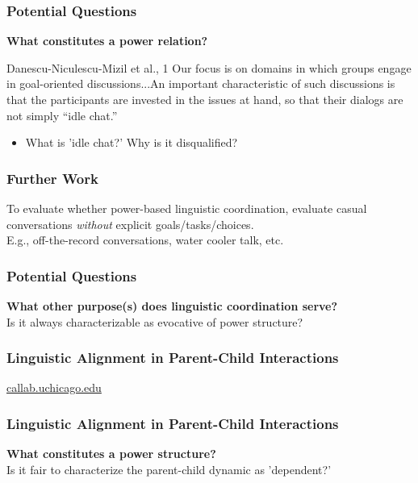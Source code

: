 \documentclass{beamer}
\begin{document}
\begin{frame}
\frametitle{Potential Questions}
\textbf{What constitutes a power relation?}
\begin{block}{Danescu-Niculescu-Mizil et al., 1}
Our focus is on domains in which groups engage in goal-oriented discussions...An important characteristic of such discussions is that the participants are invested in the issues at hand, so that their dialogs are not simply “idle chat.”
\end{block}

\begin{itemize}
	\item What is 'idle chat?' Why is it disqualified?
\end{itemize}

\end{frame}
\begin{frame}
\frametitle{Further Work}
To evaluate whether power-based linguistic coordination, evaluate casual conversations \textit{without} explicit goals/tasks/choices. \\
\quad E.g., off-the-record conversations, water cooler talk, etc.
\end{frame}
\begin{frame}
\frametitle{Potential Questions}
\textbf{What other purpose(s) does linguistic coordination serve?} \\
Is it always characterizable as evocative of power structure?
\end{frame}
\begin{frame}
\frametitle{Linguistic Alignment in Parent-Child Interactions}
\href{http://callab.uchicago.edu}{callab.uchicago.edu}
\begin{figure}
\end{figure}
\end{frame}
\begin{frame}
\frametitle{Linguistic Alignment in Parent-Child Interactions}
\textbf{What constitutes a power structure?} \\
Is it fair to characterize the parent-child dynamic as 'dependent?'\\
\end{frame}
\end{document}
